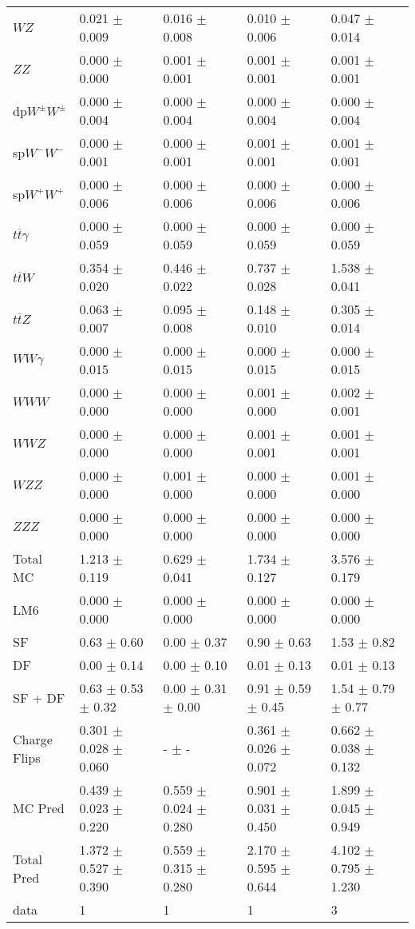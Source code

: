 \begin{tabular}{l | l l l l}
$WZ$ &  0.021 $\pm$  0.009 &  0.016 $\pm$  0.008 &  0.010 $\pm$  0.006 &  0.047 $\pm$  0.014\\
$ZZ$ &  0.000 $\pm$   0.000 &  0.001 $\pm$  0.001 &  0.001 $\pm$  0.001 &  0.001 $\pm$  0.001\\
\hline
dp$W^{\pm}W^{\pm}$ &  0.000 $\pm$  0.004 &  0.000 $\pm$  0.004 &  0.000 $\pm$  0.004 &  0.000 $\pm$  0.004\\
sp$W^{-}W^{-}$ &  0.000 $\pm$  0.001 &  0.000 $\pm$  0.001 &  0.001 $\pm$  0.001 &  0.001 $\pm$  0.001\\
sp$W^{+}W^{+}$ &  0.000 $\pm$  0.006 &  0.000 $\pm$  0.006 &  0.000 $\pm$  0.006 &  0.000 $\pm$  0.006\\
$t\overline{t}\gamma$ &  0.000 $\pm$  0.059 &  0.000 $\pm$  0.059 &  0.000 $\pm$  0.059 &  0.000 $\pm$  0.059\\
$t\overline{t}W$ &  0.354 $\pm$  0.020 &  0.446 $\pm$  0.022 &  0.737 $\pm$  0.028 &  1.538 $\pm$  0.041\\
$t\overline{t}Z$ &  0.063 $\pm$  0.007 &  0.095 $\pm$  0.008 &  0.148 $\pm$  0.010 &  0.305 $\pm$  0.014\\
$WW\gamma$ &  0.000 $\pm$  0.015 &  0.000 $\pm$  0.015 &  0.000 $\pm$  0.015 &  0.000 $\pm$  0.015\\
$WWW$ &   0.000 $\pm$   0.000 &   0.000 $\pm$   0.000 &  0.001 $\pm$   0.000 &  0.002 $\pm$  0.001\\
$WWZ$ &   0.000 $\pm$   0.000 &   0.000 $\pm$   0.000 &  0.001 $\pm$  0.001 &  0.001 $\pm$  0.001\\
$WZZ$ &   0.000 $\pm$   0.000 &  0.001 $\pm$   0.000 &   0.000 $\pm$   0.000 &  0.001 $\pm$   0.000\\
$ZZZ$ &   0.000 $\pm$   0.000 &   0.000 $\pm$   0.000 &   0.000 $\pm$   0.000 &   0.000 $\pm$   0.000\\
\hline
Total MC &  1.213 $\pm$  0.119 &  0.629 $\pm$  0.041 &  1.734 $\pm$  0.127 &  3.576 $\pm$  0.179\\
\hline\hline
\hline
LM6 &  0.000 $\pm$  0.000 &  0.000 $\pm$  0.000 &  0.000 $\pm$  0.000 &  0.000 $\pm$  0.000\\
\hline\hline
\hline\hline
 SF  & 0.63 $\pm$ 0.60 & 0.00 $\pm$ 0.37 & 0.90 $\pm$ 0.63 & 1.53 $\pm$ 0.82\\
 DF  & 0.00 $\pm$ 0.14 & 0.00 $\pm$ 0.10 & 0.01 $\pm$ 0.13 & 0.01 $\pm$ 0.13\\
\hline
 SF + DF  & 0.63 $\pm$ 0.53 $\pm$ 0.32 & 0.00 $\pm$ 0.31 $\pm$ 0.00 & 0.91 $\pm$ 0.59 $\pm$ 0.45 & 1.54 $\pm$ 0.79 $\pm$ 0.77\\
\hline\hline
Charge Flips & 0.301 $\pm$ 0.028 $\pm$ 0.060 & - $\pm$ - & 0.361 $\pm$ 0.026 $\pm$ 0.072 & 0.662 $\pm$ 0.038 $\pm$ 0.132\\
\hline\hline
\hline
MC Pred &  0.439 $\pm$  0.023 $\pm$  0.220 &  0.559 $\pm$  0.024 $\pm$  0.280 &  0.901 $\pm$  0.031 $\pm$  0.450 &  1.899 $\pm$  0.045 $\pm$  0.949\\
\hline\hline
Total Pred &  1.372 $\pm$  0.527 $\pm$  0.390 &  0.559 $\pm$  0.315 $\pm$  0.280 &  2.170 $\pm$  0.595 $\pm$  0.644 &  4.102 $\pm$  0.795 $\pm$  1.230\\
\hline\hline
data & 1 & 1 & 1 & 3\\
\hline\hline
\end{tabular}
